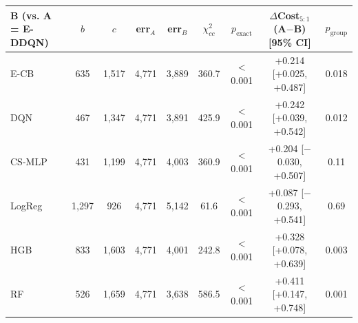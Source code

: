 \begin{tabular}{lcccccccc}
\toprule
B (vs. A = E-DDQN) & $b$ & $c$ & err$_A$ & err$_B$ & $\chi^2_{cc}$ & $p_{\text{exact}}$ & $\Delta$Cost$_{5:1}$ (A$-$B) [95\% CI] & $p_{\text{group}}$ \\
\midrule
E-CB & 635 & 1,517 & 4,771 & 3,889 & 360.7 & $<$0.001 & +0.214 [+0.025, +0.487] & 0.018 \\
DQN & 467 & 1,347 & 4,771 & 3,891 & 425.9 & $<$0.001 & +0.242 [+0.039, +0.542] & 0.012 \\
CS-MLP & 431 & 1,199 & 4,771 & 4,003 & 360.9 & $<$0.001 & +0.204 [$-$0.030, +0.507] & 0.11 \\
LogReg & 1,297 & 926 & 4,771 & 5,142 & 61.6 & $<$0.001 & +0.087 [$-$0.293, +0.541] & 0.69 \\
HGB & 833 & 1,603 & 4,771 & 4,001 & 242.8 & $<$0.001 & +0.328 [+0.078, +0.639] & 0.003 \\
RF & 526 & 1,659 & 4,771 & 3,638 & 586.5 & $<$0.001 & +0.411 [+0.147, +0.748] & 0.001 \\
\bottomrule
\end{tabular}
